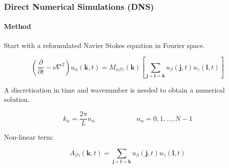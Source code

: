 \documentclass{beamer}
\begin{document}
\begin{frame}
 \frametitle{Direct Numerical Simulations (DNS)}
 \framesubtitle{Method}
 
 
 Start with a reformulated Navier Stokes equation in Fourier space. %
 
 \begin{equation}
  \left( \frac{\partial}{\partial t} - \nu \nabla^2 \right) u_\alpha (\bm k, t) = M_{\alpha \beta \gamma}(\bm k) \left[ \sum_{\bm j + \bm l = \bm k} u_\beta (\bm j, t) u_\gamma (\bm l, t) \right]
 \end{equation}%
 
 A discretisation in time and wavenumber is needed to obtain a numerical solution. %
 
 \begin{equation}
  k_\alpha = \frac{2 \pi}{L} n_\alpha \qquad \qquad \qquad n_\alpha = 0, 1, \ldots, N - 1
 \end{equation}
 
 
 Non-linear term:
 
 \begin{equation}
  A_{\beta \gamma} (\bm k, t) = \sum_{\bm j + \bm l = \bm k} u_\beta (\bm j, t) u_\gamma (\bm l, t)
 \end{equation}
 
\end{frame}
\end{document}
